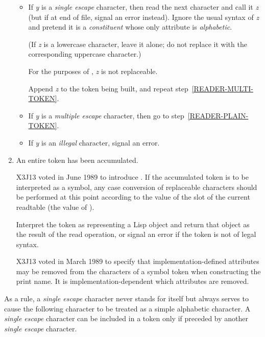 \begin{enumerate}
\begin{itemize}
\item
If {\it y} is a {\it single escape} character, then read the next character
and call it {\it z}
(but if at end of file, signal an error instead).
Ignore the usual syntax of {\it z}
and pretend it is a {\it constituent} whose only attribute is
{\it alphabetic}.
\begin{obsolete}
(If {\it z} is a lowercase character, leave it alone;
do not replace it with the corresponding uppercase character.)
\end{obsolete}
\begin{newer}
For the purposes of , {\it z} is not replaceable.
\end{newer}
Append {\it z} to the token being built,
and repeat step~\ref{READER-MULTI-TOKEN}.

\item
If {\it y} is a {\it multiple escape} character,
then go to step~\ref{READER-PLAIN-TOKEN}.

\item
If {\it y} is an {\it illegal} character, signal an error.
\end{itemize}

\item
An entire token has been accumulated.
\begin{newer}
X3J13 voted in June 1989  to introduce
.  If the accumulated token
is to be interpreted as a symbol, any case conversion of replaceable
characters should be performed at this point according to the value
of the  slot of the current readtable (the value
of ).
\end{newer}
Interpret the token as representing
a Lisp object and return that object as the result
of the read operation, or signal an error if the token
is not of legal syntax.
\begin{newer}
X3J13 voted in March 1989 
to specify that implementation-defined
attributes may be removed from the characters of a symbol token
when constructing the print name.
It is implementation-dependent which attributes are removed.
\end{newer}
\label{READER-TOKEN-END}
\end{enumerate}
\endgroup

As a rule, a {\it single escape} character never stands for itself but always
serves to cause the following character to be treated as a simple alphabetic
character.  A {\it single escape} character can be included in a token only
if preceded by another {\it single escape} character.

